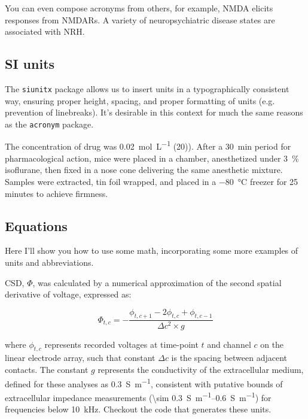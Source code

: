 \documentclass[../../main.tex]{subfiles}  %
\begin{document}
	You can even compose acronyms from others, for example, \ac{NMDA} elicits responses from \acp{NMDAR}. 
	A variety of neuropsychiatric disease states are associated with \ac{NRH}.

	\subsection{SI units}

	The \verb|siunitx| package allows us to insert units in a typographically consistent way, ensuring proper height, spacing, and proper formatting of units (e.g. prevention of linebreaks).
	It's desirable in this context for much the same reasons as the \verb|acronym| package.


	The concentration of drug was \SI[per-mode=fraction]{0.02}{\mol\per\L} (\SI{20}{\mM})).
	After a \SI{30}{\minute} period for pharmacological action, mice were placed in a chamber, anesthetized under \qty{3}{\percent} isoflurane, then fixed in a nose cone delivering the same anesthetic mixture. 
	Samples were extracted, tin foil wrapped, and placed in a \SI{-80}{\degreeCelsius} freezer for 25 minutes to achieve firmness.

	\subsection{Equations}

	Here I'll show you how to use some math, incorporating some more examples of units and abbreviations.

	\Acf{CSD}, $\Phi$, was calculated by a numerical approximation of the second spatial derivative of voltage, expressed as:

	\begin{equation}
		\Phi_{t, c} = -\frac{\phi_{t, c+1} - 2\phi_{t, c} + \phi_{t, c-1}}{\Delta c^2 \times g}
	\end{equation}

	where $\phi_{t, c}$ represents recorded voltages at time-point $t$ and channel $c$ on the linear electrode array, such that constant $\Delta c$ is the spacing between adjacent contacts. 
	The constant $g$ represents the conductivity of the extracellular medium, defined for these analyses as \SI[per-mode=fraction]{0.3}{\siemens\per\m}, consistent with putative bounds of extracellular impedance measurements (\qtyrange[range-units=single,range-phrase=-]{\sim 0.3}{0.6}{\siemens\per\m}) for frequencies below \SI{10}{\kHz}. 
	Checkout the code that generates these units. 
\end{document}
